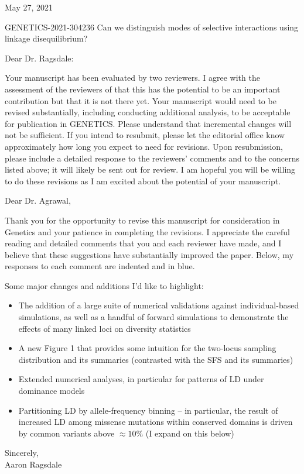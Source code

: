 \documentclass{article}
\newenvironment{response}%
  {\list{}{\leftmargin=0.5in\rightmargin=0.5in\color{blue}}\item[]}%
  {\endlist}
\begin{document}
May 27, 2021

GENETICS-2021-304236
Can we distinguish modes of selective interactions using linkage disequilibrium?

Dear Dr. Ragsdale:

Your manuscript has been evaluated by two reviewers.  I agree with the
assessment of the reviewers of that this has the potential to be an important
contribution but that it is not there yet.  Your manuscript would need to be
revised substantially, including conducting additional analysis, to be
acceptable for publication in GENETICS.  Please understand that incremental
changes will not be sufficient.  If you intend to resubmit, please let the
editorial office know approximately how long you expect to need for revisions.
Upon resubmission, please include a detailed response to the reviewers'
comments and to the concerns listed above; it will likely be sent out for
review.  I am hopeful you will be willing to do these revisions as I am excited
about the potential of your manuscript.

\begin{response}
    Dear Dr. Agrawal,

    Thank you for the opportunity to revise this manuscript for consideration
    in Genetics and your patience in completing the revisions. I appreciate
    the careful reading and detailed comments that you and each reviewer have
    made, and I believe that these suggestions have substantially improved the
    paper. Below, my responses to each comment are indented and in blue.

    Some major changes and additions I'd like to highlight:
    \begin{itemize}
        \item The addition of a large suite of numerical validations against
            individual-based simulations, as well as a handful of forward
            simulations to demonstrate the effects of many linked loci on diversity
            statistics
        \item A new Figure 1 that provides some intuition for the two-locus
            sampling distribution and its summaries (contrasted with the SFS
            and its summaries)
        \item Extended numerical analyses, in particular for patterns of LD under
            dominance models
        \item Partitioning LD by allele-frequency binning -- in particular, the
            result of increased LD among missense mutations within conserved
            domains is driven by common variants above $\approx 10\%$
            (I expand on this below)
    \end{itemize}

    \noindent
    Sincerely,\\
    Aaron Ragsdale
\end{response}
\end{document}
